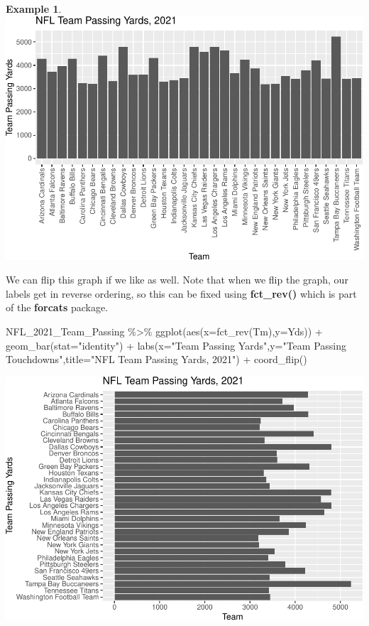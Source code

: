 \documentclass[
]{book}
\newenvironment{Shaded}{\begin{snugshade}}{\end{snugshade}}
\newcommand{\AttributeTok}[1]{\textcolor[rgb]{0.77,0.63,0.00}{#1}}
\newcommand{\FunctionTok}[1]{\textcolor[rgb]{0.00,0.00,0.00}{#1}}
\newcommand{\NormalTok}[1]{#1}
\newcommand{\SpecialCharTok}[1]{\textcolor[rgb]{0.00,0.00,0.00}{#1}}
\newcommand{\StringTok}[1]{\textcolor[rgb]{0.31,0.60,0.02}{#1}}
\theoremstyle{definition}
\theoremstyle{definition}
\newtheorem{example}{Example}[chapter]
\theoremstyle{definition}
\theoremstyle{definition}
\theoremstyle{remark}
\begin{document}
\begin{example}
\includegraphics{series_files/figure-latex/bar2-1.pdf}

We can flip this graph if we like as well. Note that when we flip the graph, our labels get in reverse ordering, so this can be fixed using \textbf{fct\_rev()} which is part of the \textbf{forcats} package.

\begin{Shaded}
\begin{Highlighting}[]
\NormalTok{NFL\_2021\_Team\_Passing }\SpecialCharTok{\%\textgreater{}\%} 
  \FunctionTok{ggplot}\NormalTok{(}\FunctionTok{aes}\NormalTok{(}\AttributeTok{x=}\FunctionTok{fct\_rev}\NormalTok{(Tm),}\AttributeTok{y=}\NormalTok{Yds)) }\SpecialCharTok{+}
  \FunctionTok{geom\_bar}\NormalTok{(}\AttributeTok{stat=}\StringTok{"identity"}\NormalTok{) }\SpecialCharTok{+}
  \FunctionTok{labs}\NormalTok{(}\AttributeTok{x=}\StringTok{"Team Passing Yards"}\NormalTok{,}\AttributeTok{y=}\StringTok{"Team Passing Touchdowns"}\NormalTok{,}\AttributeTok{title=}\StringTok{"NFL Team Passing Yards, 2021"}\NormalTok{) }\SpecialCharTok{+}
  \FunctionTok{coord\_flip}\NormalTok{()}
\end{Highlighting}
\end{Shaded}

\includegraphics{series_files/figure-latex/bar3-1.pdf}
\end{example}
\end{document}
